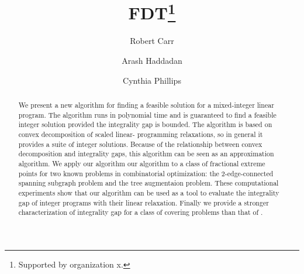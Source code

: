 \documentclass[runningheads]{llncs}
\begin{document}
%
\title{FDT\thanks{Supported by organization x.}}
%
%
\author{Robert Carr\orcidID{} \and
Arash Haddadan\orcidID{} \and
Cynthia Phillips\orcidID{}}
%
%
%
\maketitle              %
%
\begin{abstract}
We present a new algorithm for finding a feasible solution for a mixed-integer linear program. The algorithm runs in polynomial time and is guaranteed to find a feasible integer solution provided the
integrality gap is bounded. The algorithm is based on convex decomposition of scaled linear-
programming relaxations, so in general it provides a suite of integer solutions. Because of the
relationship between convex decomposition and integrality gaps, this algorithm can be seen as an approximation algorithm. We apply our algorithm our algorithm to a class of 
fractional extreme points for two known problems in combinatorial optimization: the 2-edge-connected spanning subgraph problem and the tree augmentaion problem. These computational experiments show that our algorithm can be used as a tool to evaluate the integrality gap of integer programs with their linear relaxation. Finally we provide a stronger characterization of integrality gap for a class of covering problems than that of \cite{goemans}.

\end{abstract}
%
%
%




\iffalse{

}\fi
\end{document}

